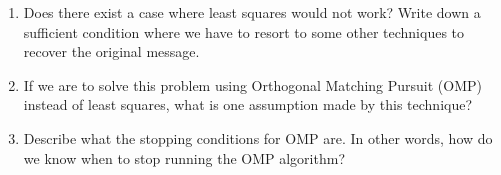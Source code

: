 \begin{enumerate}
    \noindent\fbox{
        \parbox{16cm}{
            \hspace{16cm}
            \vspace{3cm}
        }
    }
    \item Does there exist a case where least squares would not work? Write down a sufficient condition where we have to resort to some other techniques to recover the original message.

    \noindent\fbox{
        \parbox{16cm}{
            \hspace{16cm}
            \vspace{3cm}
        }
    }

    \item If we are to solve this problem using Orthogonal Matching Pursuit (OMP) instead of least squares, what is one assumption made by this technique?

    \noindent\fbox{
        \parbox{16cm}{
            \hspace{16cm}
            \vspace{2cm}
        }
    }

    \item Describe what the stopping conditions for OMP are. In other words, how do we know when to stop running the OMP algorithm?

    \noindent\fbox{
        \parbox{16cm}{
            \hspace{16cm}
            \vspace{2cm}
        }
    }
\end{enumerate}
